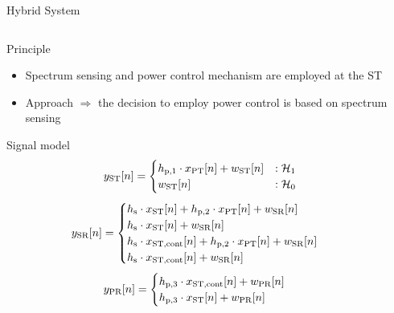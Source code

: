 \documentclass[16pt]{beamer}
\newcommand{\fs}[2]{\fontsize{#1 pt}{#2}\selectfont}
\begin{document}
\begin{frame}[t]{Hybrid System}
\begin{columns}
\begin{column}{0.45\columnwidth}
\begin{block}{\scriptsize Principle}
\begin{itemize}
					\item Spectrum sensing and power control mechanism are employed at the ST				
					\item Approach $\Rightarrow$ the decision to employ power control is based on spectrum sensing 
				\end{itemize}
			\end{block}
			\vspace{-0.5mm}
			{
				\begin{block}{\scriptsize Signal model} %
				\begin{equation*}
					y_{\text{ST}}[n] = 
					\begin{cases}
						h_{\text{p,1}} \cdot x_{\text{PT}}[n] + w_{\text{ST}}[n] & : \mathcal{H}_1 \\
						w_{\text{ST}}[n] & :\mathcal{H}_0
					\end{cases}
				\end{equation*}
				\begin{equation*}
					\ys[n] = 
					\begin{cases}
						\hs \cdot \xsfull[n] + \hptw \cdot \xp[n] + \wsr[n] \\%
						\hs \cdot \xsfull[n] + \wsr[n] \\%
						\hs \cdot \xscont[n] + \hptw \cdot \xp[n] + \wsr[n] \\%
						\hs \cdot \xscont[n] + \wsr[n] %
					\end{cases}
				\end{equation*}
				\begin{equation*}
					\yp[n] = 
					\begin{cases}
						\hpth \cdot \xscont[n] + \wpr[n] \\%
						\hpth \cdot \xsfull[n] + \wpr[n] %
					\end{cases}
				\end{equation*}
				\end{block}
			}
		\end{column}
		\begin{column}{0.55\columnwidth}
		\vspace{-12mm}
		\fs{7}{8}
		\begin{center}

\end{center}
\end{column}
\end{columns}
\end{frame}
\end{document}
